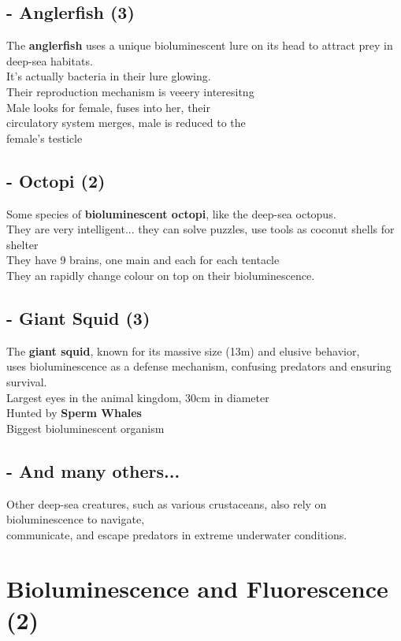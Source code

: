 \documentclass{article}
\begin{document}
\subsection*{- Anglerfish (3)}
The \textbf{anglerfish} uses a unique bioluminescent lure on its head to attract prey in deep-sea habitats.\\
It's actually bacteria in their lure glowing.\\
Their reproduction mechanism is veeery interesitng\\
Male looks for female, fuses into her, their\\
circulatory system merges, male is reduced to the \\
female's testicle

\subsection*{- Octopi (2)}
Some species of \textbf{bioluminescent octopi}, like the deep-sea octopus.\\
They are very intelligent... they can solve puzzles, use tools as coconut shells for shelter\\
They have 9 brains, one main and each for each tentacle\\
They an rapidly change colour on top on their bioluminescence.

\subsection*{- Giant Squid (3)}
The \textbf{giant squid}, known for its massive size (13m) and elusive behavior, \\
uses bioluminescence as a defense mechanism, confusing predators and ensuring survival.\\
Largest eyes in the animal kingdom, 30cm in diameter\\
Hunted by \textbf{Sperm Whales}\\
Biggest bioluminescent organism

\subsection*{- And many others... }
Other deep-sea creatures, such as various crustaceans, also rely on bioluminescence to navigate,\\
communicate, and escape predators in extreme underwater conditions.


\section*{Bioluminescence and Fluorescence (2)}
\end{document}
